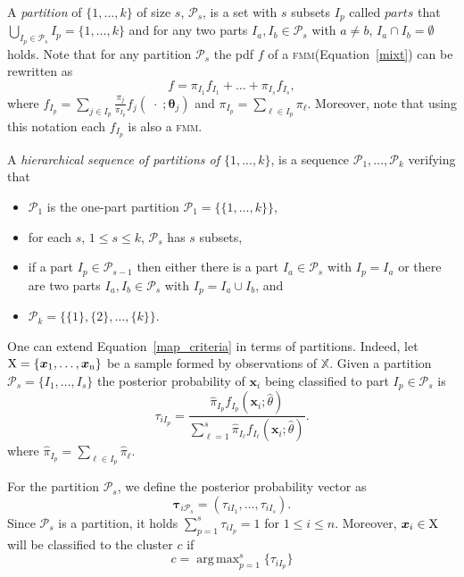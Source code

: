 \documentclass[10pt, a4paper]{article}
\DeclareMathOperator*{\argmax}{arg\,max}
\newcommand{\m}[1]{\boldsymbol{#1}}
\newcommand{\fmm}{\textsc{fmm}\xspace}
\begin{document}
\begin{spacing}{1.9}
%
A \emph{partition} of $\{1, \dots, k\}$ of size $s$, $\mathcal{P}_s$,  is a set with $s$ subsets $I_p$ called $parts$ that $\bigcup_{I_p \in \mathcal{P}_s} I_p = \{1, \dots, k\}$ and for any two parts $I_a, I_b \in \mathcal{P}_s$ with $a \neq b$, $I_a \cap I_b = \emptyset$ holds. Note that for any partition  $\mathcal{P}_s$ the pdf $f$ of a \fmm (Equation~\ref{mixt}) can be rewritten as
\begin{equation}
f = \pi_{I_1} f_{I_1} + \dots + \pi_{I_s} f_{I_s},
\label{mixt_part}
\end{equation}
where $f_{I_p} = \sum_{j \in I_p} \frac{\pi_j}{\pi_{I_p}} f_j(\;\cdot\; ; \m\theta_j)$ and $\pi_{I_p} = \sum_{\ell \in I_p} \pi_\ell$. Moreover, note that using this notation each $f_{I_p}$ is also a \fmm.



A \emph{hierarchical sequence of partitions of $\{1,...,k\}$}, is a sequence $\mathcal{P}_1, \dots, \mathcal{P}_k$ verifying that
\begin{itemize}
\item $\mathcal{P}_1$ is the one-part partition $\mathcal{P}_1 = \{ \{1, \dots, k\} \}$,
\item for each $s$, $1 \leq  s \leq k$, $\mathcal{P}_{s}$ has $s$ subsets,
\item if a part $I_p \in \mathcal{P}_{s-1}$ then either there is a part $I_a \in \mathcal{P}_{s}$ with $I_p = I_a$ or there are two parts $I_a, I_b \in \mathcal{P}_s$ with $I_p = I_a \cup I_b$, and
\item $\mathcal{P}_k= \{ \{1\},\{2\}, \dots, \{k\} \}$.
\end{itemize}



One can extend Equation~\ref{map_criteria} in terms of partitions. Indeed, let $\rm X = \{\m x_1,\dots, \m x_n\}$ be a sample formed by observations of $\mathbb{X}$. Given a partition $\mathcal{P}_s = \{ I_1, \dots, I_s \}$ the posterior probability of $\m x_i$ being classified to part $I_p\in \mathcal{P}_{s}$ is
\[
\tau_{i I_p} =  \frac{ \hat{\pi}_{I_p} f_{I_p}(\m x_i; \hat{\theta}) }{\sum_{\ell=1}^s \hat{\pi}_{I_\ell} f_{I_\ell}(\m x_i; \hat{\theta})}.
\]
where $\hat{\pi}_{I_p} = \sum_{\ell \in I_p} \hat{\pi}_\ell$.

For the partition  $\mathcal{P}_s$, we define the posterior probability vector as
\begin{equation}\label{ppv}
\m\tau_{i \mathcal{P}_s} = \left(\tau_{i I_1} , \dots, \tau_{i I_s}  \right).
\end{equation}
Since $\mathcal{P}_s$ is a partition, it holds $\sum_{p=1}^s \tau_{i I_p} = 1$ for $1 \leq i \leq n$.
Moreover, $\m x_i \in \rm X$ will be classified to the cluster $c$ if
\begin{equation}\label{cluster_criteria}
c= \argmax_{p=1}^s \{ \tau_{i I_p} \}
\end{equation}


\end{spacing}
\end{document}

